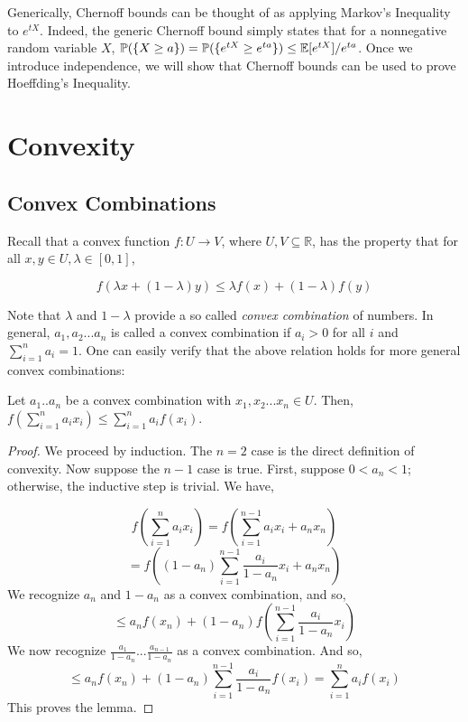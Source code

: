     Generically, Chernoff bounds can be thought of as applying Markov's Inequality to 
    $e^{tX}$. Indeed, the generic Chernoff bound simply states that for a nonnegative 
    random variable $X$, $\mathbb P(\{X \geq a\}) = \mathbb P(\{e^{tX} \geq e^{ta}\}) \leq \mathbb E[e^{tX}]/e^{ta}$. 
    Once we introduce independence, we will show that Chernoff bounds can be used to prove Hoeffding's Inequality.

    \section{Convexity}

    \subsection{Convex Combinations}

    Recall that a convex function $f : U \to V$, where $U,V \subseteq \mathbb R$, has the property that for all 
    $x,y \in U, \lambda \in [0,1]$,

    \[ f(\lambda x + (1-\lambda) y) \leq \lambda f(x) + (1-\lambda) f(y) \]

    Note that $\lambda$ and $1-\lambda$ provide a so called \emph{convex combination} of numbers. 
    In general, $a_1, a_2...a_n$ is called a convex combination if $a_i > 0$ for all $i$ and 
    $\sum_{i=1}^n a_i = 1$. One can easily verify that the above relation holds for more 
    general convex combinations: 

    \begin{lemma}
        Let $a_1..a_n$ be a convex combination with $x_1,x_2...x_n \in U$. Then, 
        $f(\sum_{i=1}^n a_i x_i) \leq \sum_{i=1}^n a_i f(x_i)$.
    \end{lemma}
    
    \begin{proof}
        We proceed by induction. The $n=2$ case is the direct definition of convexity. 
        Now suppose the $n-1$ case is true. First, suppose $0 < a_n < 1$; otherwise, the 
        inductive step is trivial. We have,

        \[ f(\sum_{i=1}^n a_i x_i) = f(\sum_{i=1}^{n-1} a_i x_i + a_n x_n) \]
        \[ = f((1-a_n)\sum_{i=1}^{n-1} \frac{a_i}{1-a_n} x_i + a_n x_n) \]
        We recognize $a_n$ and $1-a_n$ as a convex combination, and so, 
        \[ \leq a_n f(x_n) + (1-a_n) f(\sum_{i=1}^{n-1} \frac{a_i}{1-a_n} x_i) \] 
        We now recognize $\frac{a_1}{1-a_n}... \frac{a_{n-1}}{1-a_n}$ as a convex 
        combination. And so, 
        \[ \leq a_n f(x_n) + (1-a_n)\sum_{i=1}^{n-1} \frac{a_i}{1-a_n}f(x_i) = \sum_{i=1}^n a_i f(x_i) \]
        This proves the lemma.

    \end{proof}

